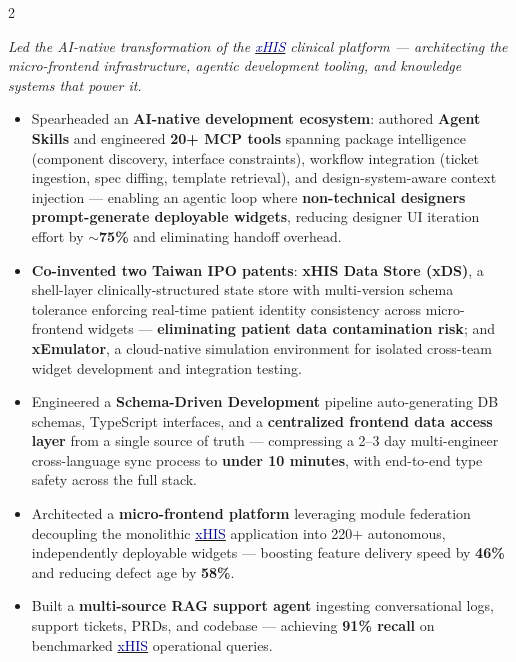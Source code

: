 \documentclass[10pt,a4paper,ragged2e,withhyper]{altacv}
\begin{document}
\begin{paracol}{2}

\textit{Led the AI-native transformation of the \href{https://aics.asus.com/xhis-en/}{\textcolor{DarkBlue}{xHIS}} clinical platform — architecting the micro-frontend infrastructure, agentic development tooling, and knowledge systems that power it.}
\begin{itemize}

  \item Spearheaded an \textbf{AI-native development ecosystem}: authored \textbf{Agent Skills} and engineered \textbf{20+ MCP tools} spanning package intelligence (component discovery, interface constraints), workflow integration (ticket ingestion, spec diffing, template retrieval), and design-system-aware context injection — enabling an agentic loop where \textbf{non-technical designers prompt-generate deployable widgets}, reducing designer UI iteration effort by \textbf{$\sim$75\%} and eliminating handoff overhead.

  \item \textbf{Co-invented two Taiwan IPO patents}: \textbf{xHIS Data Store (xDS)}, a shell-layer clinically-structured state store with multi-version schema tolerance enforcing real-time patient identity consistency across micro-frontend widgets — \textbf{eliminating patient data contamination risk}; and \textbf{xEmulator}, a cloud-native simulation environment for isolated cross-team widget development and integration testing.

  \item Engineered a \textbf{Schema-Driven Development} pipeline auto-generating DB schemas, TypeScript interfaces, and a \textbf{centralized frontend data access layer} from a single source of truth — compressing a 2–3 day multi-engineer cross-language sync process to \textbf{under 10 minutes}, with end-to-end type safety across the full stack.

  \item Architected a \textbf{micro-frontend platform} leveraging module federation decoupling the monolithic \href{https://aics.asus.com/xhis-en/}{\textcolor{DarkBlue}{xHIS}} application into 220+ autonomous, independently deployable widgets — boosting feature delivery speed by \textbf{46\%} and reducing defect age by \textbf{58\%}.

  \item Built a \textbf{multi-source RAG support agent} ingesting conversational logs, support tickets, PRDs, and codebase — achieving \textbf{91\% recall} on benchmarked \href{https://aics.asus.com/xhis-en/}{\textcolor{DarkBlue}{xHIS}} operational queries.


\end{itemize}
\end{paracol}
\end{document}
